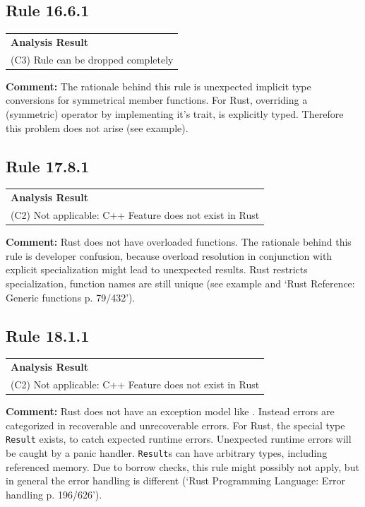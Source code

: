 \subsection*{Rule 16.6.1}
\begin{longtable}{p{13cm}}
\textbf{Analysis Result} \\
(C3) Rule can be dropped completely \\
\end{longtable}
\textbf{Comment:} The rationale behind this rule is unexpected implicit type conversions for symmetrical member functions. For Rust, overriding a (symmetric) operator by implementing it's trait, is explicitly typed. Therefore this problem does not arise (see example). \\


\subsection*{Rule 17.8.1}
\begin{longtable}{p{13cm}}
\textbf{Analysis Result} \\
(C2) Not applicable: C++ Feature does not exist in Rust \\
\end{longtable}
\textbf{Comment:} Rust does not have overloaded functions. The rationale behind this rule is developer confusion, because overload resolution in conjunction with explicit specialization might lead to unexpected results. Rust restricts specialization, function names are still unique (see example and `Rust Reference: Generic functions p. 79/432'). \\


\subsection*{Rule 18.1.1}
\begin{longtable}{p{13cm}}
\textbf{Analysis Result} \\
(C2) Not applicable: C++ Feature does not exist in Rust \\
\end{longtable}
\textbf{Comment:} Rust does not have an exception model like \Cpp. Instead errors are categorized in recoverable and unrecoverable errors. For Rust, the special type \texttt{Result} exists, to catch expected runtime errors. Unexpected runtime errors will be caught by a panic handler. \texttt{Result}s can have arbitrary types, including referenced memory. Due to borrow checks, this rule might possibly not apply, but in general the error handling is different (`Rust Programming Language: Error handling p. 196/626'). \\
